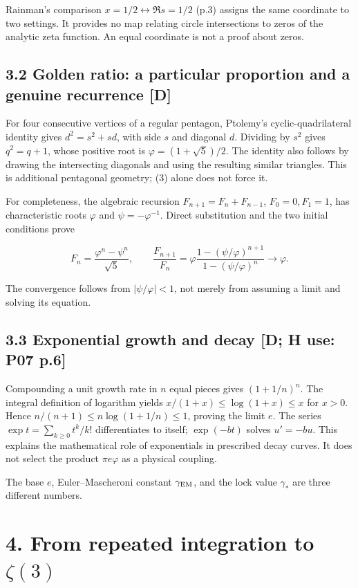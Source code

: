 \documentclass[11pt,a4paper]{article}
\begin{document}
Rainman's comparison $x=1/2\leftrightarrow\Re s=1/2$ (p.3) assigns the same coordinate to two settings. It provides no map relating circle intersections to zeros of the analytic zeta function. An equal coordinate is not a proof about zeros.


\subsection*{3.2 Golden ratio: a particular proportion and a genuine recurrence [D]}

For four consecutive vertices of a regular pentagon, Ptolemy's cyclic-quadrilateral identity gives $d^2=s^2+sd$, with side $s$ and diagonal $d$. Dividing by $s^2$ gives $q^2=q+1$, whose positive root is $\varphi=(1+\sqrt5)/2$. The identity also follows by drawing the intersecting diagonals and using the resulting similar triangles. This is additional pentagonal geometry; (3) alone does not force it.


For completeness, the algebraic recursion $F_{n+1}=F_n+F_{n-1}$, $F_0=0,F_1=1$, has characteristic roots $\varphi$ and $\psi=-\varphi^{-1}$. Direct substitution and the two initial conditions prove


\[
F_n=\frac{\varphi^n-\psi^n}{\sqrt5},\qquad
\frac{F_{n+1}}{F_n}=
\varphi\frac{1-(\psi/\varphi)^{n+1}}{1-(\psi/\varphi)^n}
\longrightarrow\varphi. \tag{5}
\]

The convergence follows from $|\psi/\varphi|<1$, not merely from assuming a limit and solving its equation.


\subsection*{3.3 Exponential growth and decay [D; H use: P07 p.6]}

Compounding a unit growth rate in $n$ equal pieces gives $(1+1/n)^n$. The integral definition of logarithm yields
$x/(1+x)\leq\log(1+x)\leq x$ for $x>0$. Hence
$n/(n+1)\leq n\log(1+1/n)\leq1$, proving the limit $e$.
The series $\exp t=\sum_{k\geq0}t^k/k!$ differentiates to itself; $\exp(-bt)$ solves $u'=-bu$. This explains the mathematical role of exponentials in prescribed decay curves. It does not select the product $\pi e\varphi$ as a physical coupling.


The base $e$, Euler--Mascheroni constant $\gamma_{\rm EM}$, and the lock value $\gamma_*$ are three different numbers.


\clearpage
\section*{4. From repeated integration to $\zeta(3)$}
\end{document}
